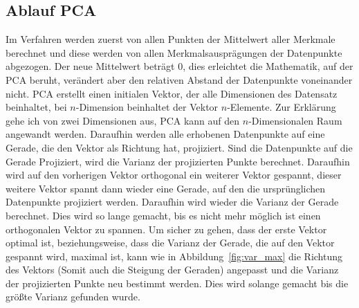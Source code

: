 \documentclass[envcountsame, envcountchap, deutsch]{i-studis}
\begin{document}
\subsection{Ablauf PCA}
Im Verfahren werden zuerst von allen Punkten der Mittelwert aller Merkmale berechnet und diese werden von allen Merkmalsausprägungen der Datenpunkte abgezogen.
Der neue Mittelwert beträgt $0$, dies erleichtet die Mathematik, auf der PCA beruht, verändert aber den relativen Abstand der Datenpunkte voneinander nicht.
PCA erstellt einen initialen Vektor, der alle Dimensionen des Datensatz beinhaltet, bei $n$-Dimension beinhaltet der Vektor $n$-Elemente. 
Zur Erklärung gehe ich von zwei Dimensionen aus, PCA kann auf den $n$-Dimensionalen Raum angewandt werden.
Daraufhin werden alle erhobenen Datenpunkte auf eine Gerade, die den Vektor als Richtung hat, projiziert. 
Sind die Datenpunkte auf die Gerade Projiziert, wird die Varianz der projizierten Punkte berechnet. 
Daraufhin wird auf den vorherigen Vektor orthogonal ein weiterer Vektor gespannt, dieser weitere Vektor spannt dann wieder eine Gerade, auf den die ursprünglichen 
Datenpunkte projiziert werden. Daraufhin wird wieder die Varianz der Gerade berechnet. Dies wird so lange gemacht, bis es nicht mehr möglich 
ist einen orthogonalen Vektor zu spannen. Um sicher zu gehen, dass der erste Vektor optimal ist, beziehungsweise, dass die Varianz der Gerade, die auf den Vektor gespannt wird, maximal ist,
kann wie in Abbildung~\ref{fig:var_max} die Richtung des Vektors (Somit auch die Steigung der Geraden) angepasst und die Varianz der projizierten Punkte neu bestimmt werden.
Dies wird solange gemacht bis die größte Varianz gefunden wurde.
\end{document}
